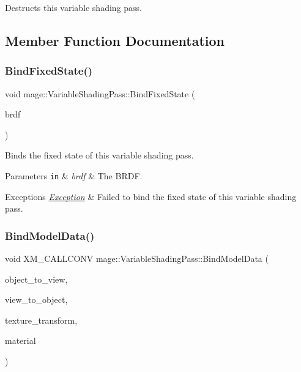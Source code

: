 Destructs this variable shading pass. 

\subsection{Member Function Documentation}
\hypertarget{classmage_1_1_variable_shading_pass_a3a5bf4764bdafd393c73b75939f68aa0}{}\label{classmage_1_1_variable_shading_pass_a3a5bf4764bdafd393c73b75939f68aa0} 
\subsubsection{\texorpdfstring{Bind\+Fixed\+State()}{BindFixedState()}}
{\footnotesize\ttfamily void mage\+::\+Variable\+Shading\+Pass\+::\+Bind\+Fixed\+State (\begin{DoxyParamCaption}\item[{\hyperlink{namespacemage_af1044f87544bc38427766a8c795d2f26}{B\+R\+D\+F\+Type}}]{brdf }\end{DoxyParamCaption})}

Binds the fixed state of this variable shading pass.


\begin{DoxyParams}[1]{Parameters}
\mbox{\tt in}  & {\em brdf} & The B\+R\+DF. \\
\hline
\end{DoxyParams}

\begin{DoxyExceptions}{Exceptions}
{\em \hyperlink{classmage_1_1_exception}{Exception}} & Failed to bind the fixed state of this variable shading pass. \\
\hline
\end{DoxyExceptions}
\hypertarget{classmage_1_1_variable_shading_pass_a397b49713231c0f9af6b5a4f9bafa394}{}\label{classmage_1_1_variable_shading_pass_a397b49713231c0f9af6b5a4f9bafa394} 
\subsubsection{\texorpdfstring{Bind\+Model\+Data()}{BindModelData()}}
{\footnotesize\ttfamily void X\+M\+\_\+\+C\+A\+L\+L\+C\+O\+NV mage\+::\+Variable\+Shading\+Pass\+::\+Bind\+Model\+Data (\begin{DoxyParamCaption}\item[{F\+X\+M\+M\+A\+T\+R\+IX}]{object\+\_\+to\+\_\+view,  }\item[{C\+X\+M\+M\+A\+T\+R\+IX}]{view\+\_\+to\+\_\+object,  }\item[{C\+X\+M\+M\+A\+T\+R\+IX}]{texture\+\_\+transform,  }\item[{const \hyperlink{classmage_1_1_material}{Material} \&}]{material }\end{DoxyParamCaption})\hspace{0.3cm}{\ttfamily [private]}}

